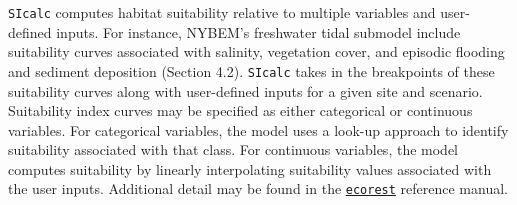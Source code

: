 \documentclass[
]{book}
\begin{document}
\texttt{SIcalc} computes habitat suitability relative to multiple variables and user-defined inputs. For instance, NYBEM's freshwater tidal submodel include suitability curves associated with salinity, vegetation cover, and episodic flooding and sediment deposition (Section 4.2). \texttt{SIcalc} takes in the breakpoints of these suitability curves along with user-defined inputs for a given site and scenario. Suitability index curves may be specified as either categorical or continuous variables. For categorical variables, the model uses a look-up approach to identify suitability associated with that class. For continuous variables, the model computes suitability by linearly interpolating suitability values associated with the user inputs. Additional detail may be found in the \href{https://cran.r-project.org/web/packages/ecorest/index.html}{\texttt{ecorest}} reference manual.
\end{document}
